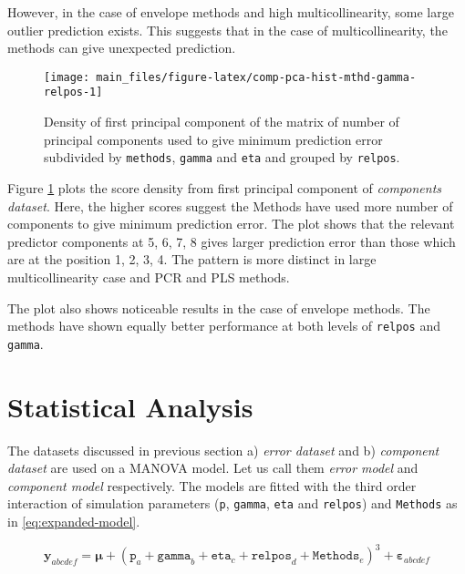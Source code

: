 \documentclass[12pt,3p,authoryear]{elsarticle}
\begin{document}
However, in the case of envelope methods and high multicollinearity,
some large outlier prediction exists. This suggests that in the case of
multicollinearity, the methods can give unexpected prediction.






\begin{figure}[!htb]
\texttt{[image: main\_files/figure-latex/comp-pca-hist-mthd-gamma-relpos-1]} \caption{Density of first principal component of the matrix of
number of principal components used to give minimum prediction error
subdivided by \texttt{methods}, \texttt{gamma} and \texttt{eta} and
grouped by \texttt{relpos}.}\label{fig:comp-pca-hist-mthd-gamma-relpos}
\end{figure}

Figure \ref{fig:comp-pca-hist-mthd-gamma-relpos} plots the score density
from first principal component of \emph{components dataset}. Here, the
higher scores suggest the Methods have used more number of components to
give minimum prediction error. The plot shows that the relevant
predictor components at 5, 6, 7, 8 gives larger prediction error than
those which are at the position 1, 2, 3, 4. The pattern is more distinct
in large multicollinearity case and PCR and PLS methods.

The plot also shows noticeable results in the case of envelope methods.
The methods have shown equally better performance at both levels of
\texttt{relpos} and \texttt{gamma}.

\hypertarget{statistical-analysis}{\section{Statistical
Analysis}\label{statistical-analysis}}

The datasets discussed in previous section a) \emph{error dataset} and
b) \emph{component dataset} are used on a MANOVA model. Let us call them
\emph{error model} and \emph{component model} respectively. The models
are fitted with the third order interaction of simulation parameters
(\texttt{p}, \texttt{gamma}, \texttt{eta} and \texttt{relpos}) and
\texttt{Methods} as in \eqref{eq:expanded-model}.

\begin{equation}
\mathbf{y}_{abcdef} = \boldsymbol{\mu} + (\texttt{p}_a + \texttt{gamma}_b + \texttt{eta}_c + \texttt{relpos}_d + \texttt{Methods}_e)^3 + \boldsymbol{\varepsilon}_{abcdef}
\label{eq:expanded-model}
\end{equation}
\end{document}
